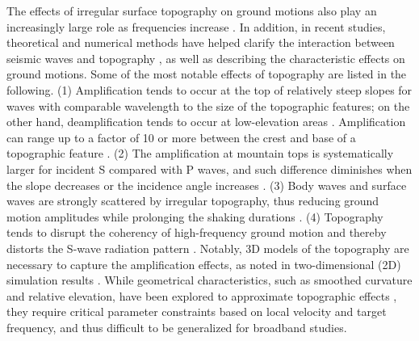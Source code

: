 The effects of irregular surface topography on ground motions also play an increasingly large role as frequencies increase . In addition, in recent studies, theoretical and numerical methods have helped clarify the interaction between seismic waves and topography \citep[mainly scattering and trapping of waves, e.g.,][]{imperatoriRoleTopographyLateral2015,takemura2015scattering,rodgersBroadband04Hz2018}, as well as describing the characteristic effects on ground motions. Some of the most notable effects of topography are listed in the following. (1) Amplification tends to occur at the top of relatively steep slopes for waves with comparable wavelength to the size of the topographic features; on the other hand, deamplification tends to occur at low-elevation areas \citep{trifunacAnalysisPacoimaDam1971,booreNoteEffectSimple1972,spudichDirectionalTopographicSite1996,bouchonSeismicResponseHill1996,assimakiSoilDependentTopographicEffects2005}. Amplification can range up to a factor of 10 or more between the crest and base of a topographic feature \citep{davisObservedEffectsTopography1973,geliEffectTopographyEarthquake1988,umedaHighAccelerationsProduced1987,gaffetSiteEffectStudy2000}. (2) The amplification at mountain tops is systematically larger for incident S compared with P waves, and such difference diminishes when the slope decreases or the incidence angle increases \citep{bardDiffractedWavesDisplacement1982}. (3) Body waves and surface waves are strongly scattered by irregular topography, thus reducing ground motion amplitudes while prolonging the shaking durations \citep{sanchez-sesmaDiffractionSVRayleigh1991,leeEffectsRealisticSurface2009}. (4) Topography tends to disrupt the coherency of high-frequency ground motion and thereby distorts the S-wave radiation pattern \citep{imperatoriRoleTopographyLateral2015}. Notably, 3D models of the topography are necessary to capture the amplification effects, as noted in two-dimensional (2D) simulation results \citep{geliEffectTopographyEarthquake1988,bouchonSeismicResponseHill1996}. While geometrical characteristics, such as smoothed curvature and relative elevation, have been explored to approximate topographic effects , they require critical parameter constraints based on local velocity and target frequency, and thus difficult to be generalized for broadband studies.

